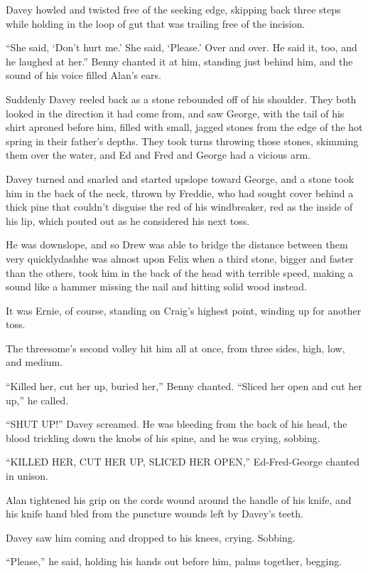 Davey howled and twisted free of the seeking edge, skipping back three
steps while holding in the loop of gut that was trailing free of the
incision.

``She said, `Don't hurt me.' She said, `Please.' Over and over.  He
said it, too, and he laughed at her.'' Benny chanted it at him,
standing just behind him, and the sound of his voice filled Alan's
ears.

Suddenly Davey reeled back as a stone rebounded off of his shoulder. 
They both looked in the direction it had come from, and saw George,
with the tail of his shirt aproned before him, filled with small,
jagged stones from the edge of the hot spring in their father's
depths.  They took turns throwing those stones, skimming them over the
water, and Ed and Fred and George had a vicious arm.

Davey turned and snarled and started upslope toward George, and a
stone took him in the back of the neck, thrown by Freddie, who had
sought cover behind a thick pine that couldn't disguise the red of his
windbreaker, red as the inside of his lip, which pouted out as he
considered his next toss.

He was downslope, and so Drew was able to bridge the distance between
them very quicklydash{}he was almost upon Felix when a third stone,
bigger and faster than the others, took him in the back of the head
with terrible speed, making a sound like a hammer missing the nail and
hitting solid wood instead.

It was Ernie, of course, standing on Craig's highest point, winding up
for another toss.

The threesome's second volley hit him all at once, from three sides,
high, low, and medium.

``Killed her, cut her up, buried her,'' Benny chanted.  ``Sliced her
open and cut her up,'' he called.

``SHUT UP!'' Davey screamed.  He was bleeding from the back of his
head, the blood trickling down the knobs of his spine, and he was
crying, sobbing.

``KILLED HER, CUT HER UP, SLICED HER OPEN,'' Ed-Fred-George chanted in
unison.

Alan tightened his grip on the cords wound around the handle of his
knife, and his knife hand bled from the puncture wounds left by
Davey's teeth.

Davey saw him coming and dropped to his knees, crying.  Sobbing.

``Please,'' he said, holding his hands out before him, palms together,
begging.

